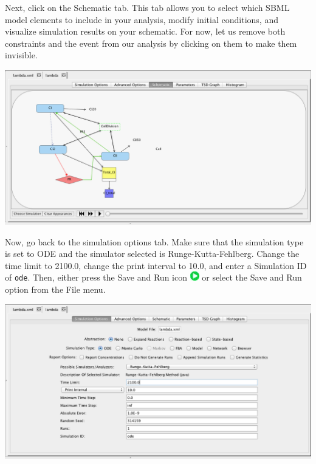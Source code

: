 \documentclass[titlepage,11pt]{article}
\begin{document}
Next, click on the Schematic tab.  This tab allows you to select which SBML model elements to include in your analysis, modify initial conditions, and visualize simulation results on your schematic.  For now, let us remove both constraints and the event from our analysis by clicking on them to make them invisible.  

\begin{center}
\includegraphics[width=160mm]{screenshots/SBMLElements}
\end{center}

Now, go back to the simulation options tab.  Make sure that the simulation type is set to ODE and the simulator selected is Runge-Kutta-Fehlberg.  Change the time limit to 2100.0, change the print interval to 10.0, and enter a Simulation ID of {\tt ode}.  Then, either press the Save and Run icon \includegraphics{../gui/icons/run-icon} or select the Save and Run option from the File menu.  

\begin{center}
\includegraphics[width=160mm]{screenshots/analysisView}
\end{center}
\end{document}
